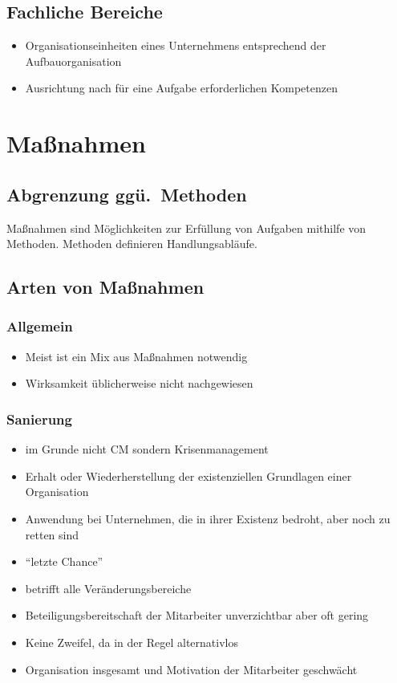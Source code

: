 \documentclass[a4paper, 12pt]{article}
\begin{document}
\subsection{Fachliche Bereiche}
\begin{itemize}
  \item Organisationseinheiten eines Unternehmens entsprechend der Aufbauorganisation
  \item Ausrichtung nach für eine Aufgabe erforderlichen Kompetenzen
\end{itemize}


\section{Maßnahmen}


\subsection{Abgrenzung ggü.\ Methoden}
Maßnahmen sind Möglichkeiten zur Erfüllung von Aufgaben mithilfe von Methoden.
Methoden definieren Handlungsabläufe.


\subsection{Arten von Maßnahmen}

\subsubsection{Allgemein}
\begin{itemize}
  \item Meist ist ein Mix aus Maßnahmen notwendig
  \item Wirksamkeit üblicherweise nicht nachgewiesen
\end{itemize}

\subsubsection{Sanierung}
\begin{itemize}
  \item im Grunde nicht CM sondern Krisenmanagement
  \item Erhalt oder Wiederherstellung der existenziellen Grundlagen einer Organisation
  \item Anwendung bei Unternehmen, die in ihrer Existenz bedroht, aber noch zu retten sind
  \item ``letzte Chance''
  \item betrifft alle Veränderungsbereiche
  \item Beteiligungsbereitschaft der Mitarbeiter unverzichtbar aber oft gering
\end{itemize}
\begin{itemize}
  \renewcommand{\labelitemi}{+}%
  \item Keine Zweifel, da in der Regel alternativlos
\end{itemize}
\begin{itemize}
  \renewcommand{\labelitemi}{\(-\)}%
  \item Organisation insgesamt und Motivation der Mitarbeiter geschwächt
\end{itemize}
\end{document}
